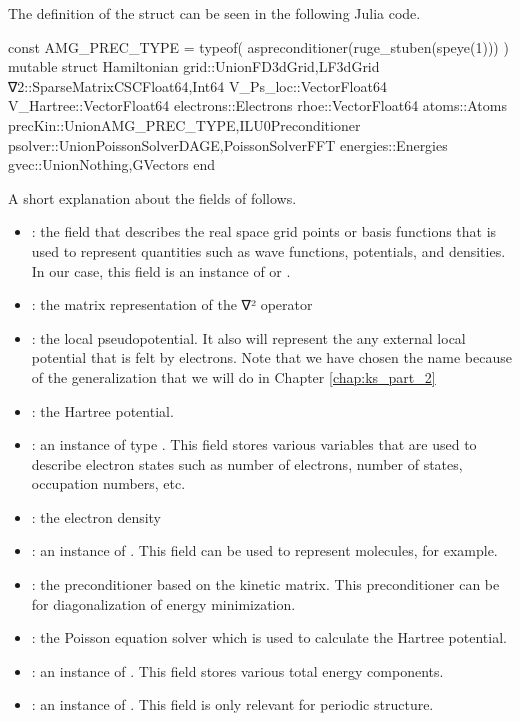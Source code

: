 The definition of the  struct can be seen in the following
Julia code.
\begin{juliacode}
const AMG_PREC_TYPE = typeof( aspreconditioner(ruge_stuben(speye(1))) )
mutable struct Hamiltonian
    grid::Union{FD3dGrid,LF3dGrid}
    ∇2::SparseMatrixCSC{Float64,Int64}
    V_Ps_loc::Vector{Float64}
    V_Hartree::Vector{Float64}
    electrons::Electrons
    rhoe::Vector{Float64}
    atoms::Atoms
    precKin::Union{AMG_PREC_TYPE,ILU0Preconditioner}
    psolver::Union{PoissonSolverDAGE,PoissonSolverFFT}
    energies::Energies
    gvec::Union{Nothing,GVectors}
end
\end{juliacode}
%
A short explanation about the fields of  follows.
\begin{itemize}
%
  \item {}: the field that describes the real space grid points or
basis functions that is used to represent quantities such as wave functions,
potentials, and densities. In our case, this field is an instance of
 or .
%
\item {}: the matrix representation of the ∇² operator
%
\item {}: the local pseudopotential. It also will represent the
any external local potential that is felt by electrons.
Note that we have chosen the name  because of the
generalization that we will do in Chapter \ref{chap:ks_part_2}
%
\item {}: the Hartree potential.
%
\item {}: an instance of type . This field
stores various variables that are used to describe electron states such as number
of electrons, number of states, occupation numbers, etc.
%
\item {}: the electron density
%
\item {}: an instance of . This field can be used to represent
molecules, for example.
%
\item {}: the preconditioner based on the kinetic matrix. This preconditioner
can be for diagonalization of energy minimization.
%
\item {}: the Poisson equation solver which is used to calculate the Hartree
potential.
%
\item {}: an instance of . This field stores
various total energy components.
%
\item {}: an instance of . This field is only relevant for
periodic structure.
%
\end{itemize}


